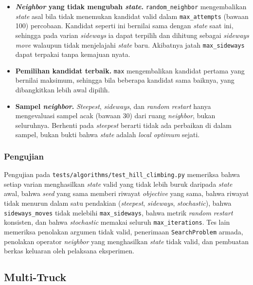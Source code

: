 \begin{itemize}
    \item \textbf{\textit{Neighbor} yang tidak mengubah \textit{state}.} \texttt{random\_neighbor} mengembalikan \textit{state} asal bila tidak menemukan kandidat valid dalam \texttt{max\_attempts} (bawaan 100) percobaan. Kandidat seperti ini bernilai sama dengan \textit{state} saat ini, sehingga pada varian \textit{sideways} ia dapat terpilih dan dihitung sebagai \textit{sideways move} walaupun tidak menjelajahi \textit{state} baru. Akibatnya jatah \texttt{max\_sideways} dapat terpakai tanpa kemajuan nyata.
    \item \textbf{Pemilihan kandidat terbaik.} \texttt{max} mengembalikan kandidat pertama yang bernilai maksimum, sehingga bila beberapa kandidat sama baiknya, yang dibangkitkan lebih awal dipilih.
    \item \textbf{Sampel \textit{neighbor}.} \textit{Steepest}, \textit{sideways}, dan \textit{random restart} hanya mengevaluasi sampel acak (bawaan 30) dari ruang \textit{neighbor}, bukan seluruhnya. Berhenti pada \textit{steepest} berarti tidak ada perbaikan di dalam sampel, bukan bukti bahwa \textit{state} adalah \textit{local optimum} sejati.
\end{itemize}

\subsubsection{Pengujian}

Pengujian pada \texttt{tests/\allowbreak algorithms/\allowbreak test\_\allowbreak hill\_\allowbreak climbing.py} memeriksa bahwa setiap varian menghasilkan \textit{state} valid yang tidak lebih buruk daripada \textit{state} awal, bahwa \textit{seed} yang sama memberi riwayat \textit{objective} yang sama, bahwa riwayat tidak menurun dalam satu pendakian (\textit{steepest}, \textit{sideways}, \textit{stochastic}), bahwa \texttt{sideways\_moves} tidak melebihi \texttt{max\_sideways}, bahwa metrik \textit{random restart} konsisten, dan bahwa \textit{stochastic} memakai seluruh \texttt{max\_iterations}. Tes lain memeriksa penolakan argumen tidak valid, penerimaan \texttt{SearchProblem} armada, penolakan operator \textit{neighbor} yang menghasilkan \textit{state} tidak valid, dan pembuatan berkas keluaran oleh pelaksana eksperimen.

\subsection{Multi-Truck}

